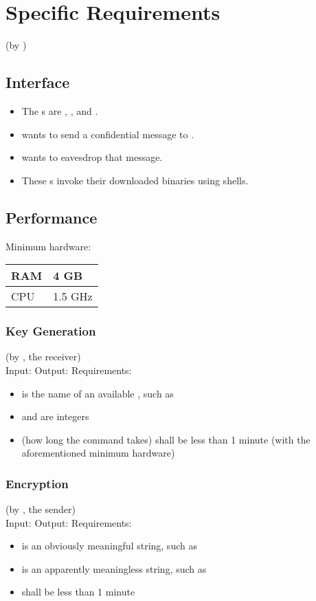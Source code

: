 \section{Specific Requirements}
(by \vp)


\subsection{Interface}

\begin{itemize}
\item The \eu s are \alice, \bob, and \eve.
\item \alice{} wants to send a confidential message to \bob.
\item \eve{} wants to eavesdrop that message.
\item These \eu s invoke their downloaded \cry{} binaries
  using \cl{} shells.
\end{itemize}


\subsection{Performance}

Minimum hardware: \\ \medskip
\begin{tabular}{l|l}
RAM & 4 GB \\ \hline
CPU & 1.5 GHz
\end{tabular}

\subsubsection{Key Generation}
(by \bob, the receiver) \\ \medskip
Input: \generatekeysin
Output: \generatekeysout
Requirements:
\begin{itemize}
\item \csarg{} is the name of an available \cs, such as 
\item \publickeyarg{} and \privatekeyarg{} are integers
\item \generatekeystime{} (how long the command takes)
  shall be less than 1 minute
  (with the aforementioned minimum hardware)
\end{itemize}

\subsubsection{Encryption}
(by \alice, the sender)  \\ \medskip
Input: \encryptin
Output: \encryptout
Requirements:
\begin{itemize}
\item \plaintextarg{} is an obviously meaningful string,
  such as \plaintextex
\item \ciphertextarg{} is an apparently meaningless string,
  such as \ciphertextex
\item \encrypttime{} shall be less than 1 minute
\end{itemize}

